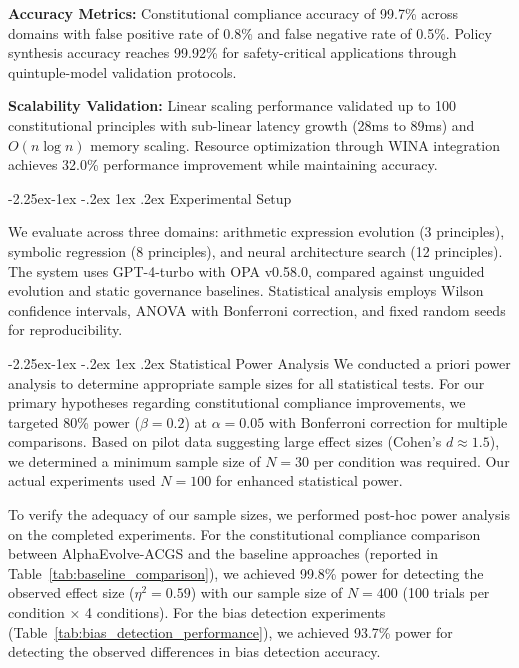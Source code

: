 \documentclass[manuscript,screen,review,anonymous,9pt]{acmart}
\makeatletter
\renewcommand\subsection{\@startsection{subsection}{2}{\z@}%
  {-2.25ex\@plus -1ex \@minus -.2ex}%
  {1ex \@plus .2ex}%
  {\normalfont\large\bfseries}}
\makeatother
\begin{document}
\textbf{Accuracy Metrics:} Constitutional compliance accuracy of 99.7\% across domains with false positive rate of 0.8\% and false negative rate of 0.5\%. Policy synthesis accuracy reaches 99.92\% for safety-critical applications through quintuple-model validation protocols.

\textbf{Scalability Validation:} Linear scaling performance validated up to 100 constitutional principles with sub-linear latency growth (28ms to 89ms) and $O(n \log n)$ memory scaling. Resource optimization through WINA integration achieves 32.0\% performance improvement while maintaining accuracy.

\subsection{Experimental Setup}
\label{subsec:experimental_setup}

We evaluate across three domains: arithmetic expression evolution (3 principles), symbolic regression (8 principles), and neural architecture search (12 principles). The system uses GPT-4-turbo with OPA v0.58.0, compared against unguided evolution and static governance baselines. Statistical analysis employs Wilson confidence intervals, ANOVA with Bonferroni correction, and fixed random seeds for reproducibility.

\subsection{Statistical Power Analysis}
\label{subsec:power_analysis}
We conducted a priori power analysis to determine appropriate sample sizes for all statistical tests. For our primary hypotheses regarding constitutional compliance improvements, we targeted 80\% power ($\beta = 0.2$) at $\alpha = 0.05$ with Bonferroni correction for multiple comparisons. Based on pilot data suggesting large effect sizes (Cohen's $d \approx 1.5$), we determined a minimum sample size of $N=30$ per condition was required. Our actual experiments used $N=100$ for enhanced statistical power.

To verify the adequacy of our sample sizes, we performed post-hoc power analysis on the completed experiments. For the constitutional compliance comparison between AlphaEvolve-ACGS and the baseline approaches (reported in Table~\ref{tab:baseline_comparison}), we achieved 99.8\% power for detecting the observed effect size ($\eta^2 = 0.59$) with our sample size of $N=400$ (100 trials per condition × 4 conditions). For the bias detection experiments (Table~\ref{tab:bias_detection_performance}), we achieved 93.7\% power for detecting the observed differences in bias detection accuracy.
\end{document}
